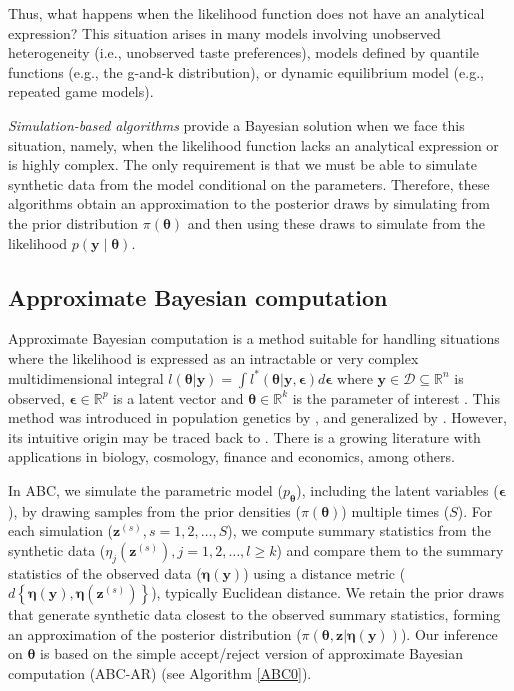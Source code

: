 Thus, what happens when the likelihood function does not have an analytical expression? This situation arises in many models involving unobserved heterogeneity (i.e., unobserved taste preferences), models defined by quantile functions (e.g., the g-and-k distribution), or dynamic equilibrium model (e.g., repeated game models).

\textit{Simulation-based algorithms} provide a Bayesian solution when we face this situation, namely, when the likelihood function lacks an analytical expression or is highly complex. The only requirement is that we must be able to simulate synthetic data from the model conditional on the parameters. Therefore, these algorithms obtain an approximation to the posterior draws by simulating from the prior distribution $\pi(\boldsymbol{\theta})$ and then using these draws to simulate from the likelihood $p(\mathbf{y} \mid \boldsymbol{\theta})$.

\subsection{Approximate Bayesian computation}\label{sec15_12}

Approximate Bayesian computation is a method suitable for handling situations where the likelihood is expressed as an intractable or very complex multidimensional integral $l(\boldsymbol\theta|\boldsymbol y)=\int l^*(\boldsymbol\theta|\boldsymbol y, \boldsymbol{\epsilon})d\boldsymbol{\epsilon}$ where $\boldsymbol y\in \mathcal{D}\subseteq \mathbb{R}^{n}$ is observed, $\boldsymbol{\epsilon}\in \mathbb{R}^p$ is a latent vector and $\boldsymbol\theta\in\mathbb{R}^k$ is the parameter of interest \cite{marin2012approximate}. This method was introduced in population genetics by \cite{tavare1997inferring,pritchard1999population}, and generalized by \cite{beaumont2002approximate}. However, its intuitive origin may be traced back to \cite{rubin1984bayesianly}. There is a growing literature with applications in biology, cosmology, finance and economics, among others.

In ABC, we simulate the parametric model ($p_{\boldsymbol{\theta}}$), including the latent variables ($\boldsymbol{\epsilon}$), by drawing samples from the prior densities ($\pi({\boldsymbol{\theta}})$) multiple times ($S$). For each simulation ($\boldsymbol{z}^{(s)}, s=1,2,\dots,S$), we compute summary statistics from the synthetic data ($\eta_j(\boldsymbol{z}^{(s)}), j=1,2,\dots,l\geq k$) and compare them to the summary statistics of the observed data ($\boldsymbol{\eta}(\boldsymbol{y})$) using a distance metric ($d\left\{{\boldsymbol\eta }({\boldsymbol y}),{\boldsymbol \eta }({\boldsymbol z}^{(s)})\right\}$), typically Euclidean distance. We retain the prior draws that generate synthetic data closest to the observed summary statistics, forming an approximation of the posterior distribution ($\pi(\boldsymbol{\theta},\boldsymbol{z}|\boldsymbol{\eta}(\boldsymbol{y}))$). Our inference on $\boldsymbol{\theta}$ is based on the simple accept/reject version of approximate Bayesian computation (ABC-AR) (see Algorithm \ref{ABC0}).

